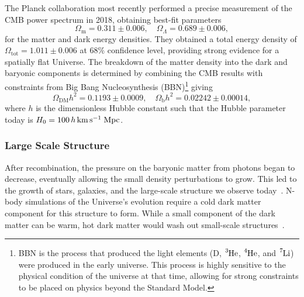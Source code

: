 The Planck collaboration most recently performed a precise measurement of the CMB power spectrum in 2018, obtaining best-fit parameters~\cite{Planck:2018vyg_sep_Planck2018results,Planck:2019nip_sep_Planck2018results}
\begin{equation}
     \Omega_\mathrm{m} = 0.311 \pm 0.006,\quad \Omega_\Lambda = 0.689 \pm 0.006,
\end{equation}
for the matter and dark energy densities. They obtained a total energy density of $\Omega_\mathrm{tot} = 1.011 \pm 0.006$ at $68\%$ confidence level, providing strong evidence for a spatially flat Universe. 
The breakdown of the matter density into the dark and baryonic components is determined by combining the CMB results with constraints from Big Bang Nucleosynthesis (BBN)\footnote{BBN is the process that produced the light elements (D, $\ce{^3 He}$, $\ce{^4 He}$, and $\ce{^7 Li}$) were produced in the early universe. This process is highly sensitive to the physical condition of the universe at that time, allowing for strong constraints to be placed on physics beyond the Standard Model.} giving
\begin{equation}
    \Omega_\mathrm{DM}h^2 = 0.1193 \pm 0.0009,\quad \Omega_\mathrm{b}h^2 = 0.02242 \pm 0.00014,
\end{equation}
where $h$ is the dimensionless Hubble constant such that the Hubble parameter today is $H_0 = 100\, h{\rm \,km}{\rm \,s}^{-1}\;\mathrm{Mpc}$. 



\subsubsection*{Large Scale Structure}
After recombination, the pressure on the baryonic matter from photons began to decrease, eventually allowing the small density perturbations to grow. This led to the growth of stars, galaxies, and the large-scale structure we observe today~\cite{Springel:2006vs_LargescalestructureUniverse}. N-body simulations of the Universe's evolution require a cold dark matter component for this structure to form. While a small component of the dark matter can be warm, hot dark matter would wash out small-scale structures~\cite{Springel:2005nw_Simulatingjointevolution}.  

